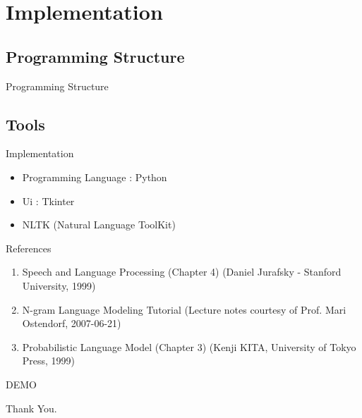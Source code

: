 \documentclass{beamer}
\begin{document}
\section{Implementation}
\subsection{Programming Structure}
\begin{frame}{Programming Structure}
    \smartdiagramset{}
    \begin{center}
    \end{center}
\end{frame}

\subsection{Tools}
\begin{frame}{Implementation}
    \begin{itemize}
        \item Programming Language : Python
        \item Ui : Tkinter
        \item NLTK (Natural Language ToolKit)
    \end{itemize}
\end{frame}


\begin{frame}{References}
    \begin{enumerate}
        \item Speech and Language Processing (Chapter 4) (Daniel Jurafsky - Stanford University, 1999)
        \item N-gram Language Modeling Tutorial (Lecture notes courtesy of Prof. Mari Ostendorf, 2007-06-21)
        \item Probabilistic Language Model (Chapter 3) (Kenji KITA, University of Tokyo Press, 1999)
    \end{enumerate}
\end{frame}
\begin{frame}
    \centering
    \Huge DEMO
\end{frame}


\begin{frame}
    \centering
    \Huge Thank You.
\end{frame}
\end{document}

